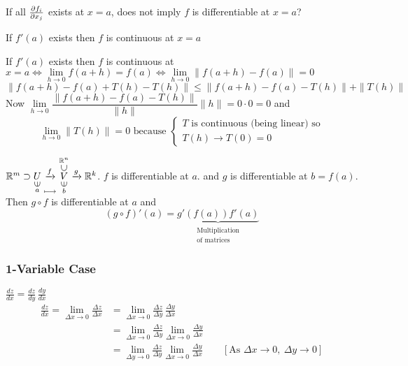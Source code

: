 If all $\frac{\partial f_i}{\partial x_j}$ exists at $x=a$, does not imply  $f$ is differentiable at $x=a$?
\begin{Theorem}{}{}
	If $f'(a)$ exists then $f$ is continuous at $x=a$
\end{Theorem}
\begin{myproof}
	If $f'(a)$ exists then $f$ is continuous at $x=a\iff\lim\limits_{h\to 0}f(a+h)=f(a)\iff\lim\limits_{h\to 0}\|f(a+h)-f(a)\|=0$
	$$\|f(a+h)-f(a)+T(h)-T(h)\|\leq \|f(a+h)-f(a)-T(h)\|+\|T(h)\|$$Now $\lim\limits_{h\to 0}\dfrac{\|f(a+h)-f(a)-T(h)\|}{\|h\|}\|h\|=0\cdot 0=0$ and $$\lim_{h\to 0}\|T(h)\|=0\text{ because }\begin{cases*}
		T\text{ is continuous (being linear) so}\\
		T(h)\to T(0)=0
	\end{cases*}$$
\end{myproof}
\pagebreak
\begin{Theorem}{}{}
	$\bbR^m\supset \underset{  \substack{{\uin} \\ {a}}  }{U} \underset{  \substack{\quad \\[0.25cm]\longmapsto}}{\xrightarrow{f}}   \underset{\substack{  \uin \\ b}}{  \overset{\substack{{\bbR^n} \\ \usubset}}{V}  }\xrightarrow{g}\bbR^k $. $f$ is differentiable at $a$. and $g$  is differentiable at $b=f(a)$. Then $g\circ f$ is differentiable at $a$  and $$(g\circ f)'(a)=\underbrace{g'(f(a))f'(a)}_{\substack{\text{Multiplication}\\ \text{of matrices}}}$$
\end{Theorem}
\begin{myproof}
	\subsubsection{1-Variable Case}
	$\frac{dz}{dx}=\frac{dz}{dy}\, \frac{dy}{dx}$\begin{align*}
		\frac{dz}{dx} =\lim_{\Delta x\to 0} \frac{\Delta z}{\Delta x} &=\lim_{\Delta x\to 0}\frac{\Delta z}{\Delta y}\, \frac{\Delta y}{\Delta x}\\
		& =\lim_{\Delta x\to 0}\frac{\Delta z}{\Delta y}\lim_{\Delta x\to 0} \frac{\Delta y}{\Delta x}\\
		& =\lim_{\Delta y\to 0}\frac{\Delta z}{\Delta y}\lim_{\Delta x\to 0} \frac{\Delta y}{\Delta x}\qquad [\text{As }\Delta x\to0,\ \Delta y\to 0]
	\end{align*}
\end{myproof}
